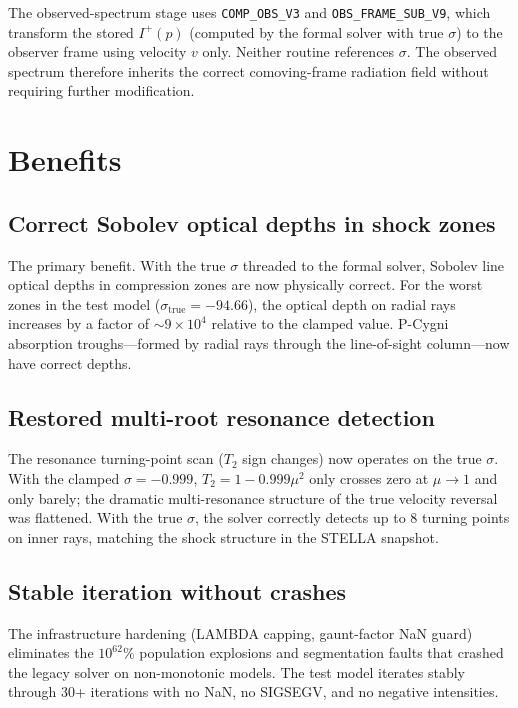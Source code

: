 \documentclass[11pt,a4paper]{article}
\begin{document}
The observed-spectrum stage uses \texttt{COMP\_OBS\_V3} and
\texttt{OBS\_FRAME\_SUB\_V9}, which transform the stored $I^+(p)$
(computed by the formal solver with true $\sigma$) to the observer
frame using velocity $v$ only.  Neither routine references $\sigma$.
The observed spectrum therefore inherits the correct comoving-frame
radiation field without requiring further modification.

\section{Benefits}
\label{sec:benefits}

\subsection{Correct Sobolev optical depths in shock zones}

The primary benefit.  With the true $\sigma$ threaded to the formal
solver, Sobolev line optical depths in compression zones are now
physically correct.  For the worst zones in the test model
($\sigma_{\mathrm{true}} = -94.66$), the optical depth on radial rays
increases by a factor of $\sim 9 \times 10^4$ relative to the clamped
value.  P-Cygni absorption troughs---formed by radial rays through the
line-of-sight column---now have correct depths.

\subsection{Restored multi-root resonance detection}

The resonance turning-point scan ($T_2$ sign changes) now operates on
the true $\sigma$.  With the clamped $\sigma = -0.999$, $T_2 = 1 - 0.999\mu^2$
only crosses zero at $\mu \to 1$ and only barely; the dramatic
multi-resonance structure of the true velocity reversal was flattened.
With the true $\sigma$, the solver correctly detects up to 8 turning
points on inner rays, matching the shock structure in the STELLA
snapshot.

\subsection{Stable iteration without crashes}

The infrastructure hardening (LAMBDA capping, gaunt-factor NaN guard)
eliminates the $10^{62}\%$ population explosions and segmentation faults
that crashed the legacy solver on non-monotonic models.  The test model
iterates stably through 30+ iterations with no NaN, no SIGSEGV, and no
negative intensities.
\end{document}

